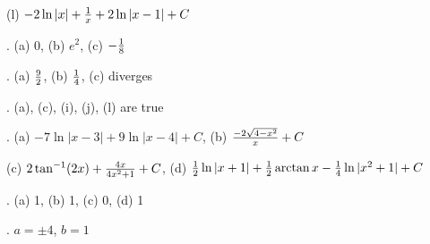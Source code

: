 \documentclass[12pt]{article}
\begin{document}
\noindent (l)  $-2 \ln|x| + {{1}\over{x}} + 2 \ln|x-1| + C$

. (a) 0, (b) $e^2$, (c) $-{{1}\over{8}}$ 

. (a) ${{9}\over{2}}$, (b) ${{1}\over{4}}$, (c) diverges

.  (a), (c), (i), (j), (l) are true

. (a) $-7 \ln|x-3|+9\ln |x-4|+C$,  (b) ${{-2\sqrt{4-x^2}}\over{x}}+ 
C$ 

\noindent (c) $2 \tan ^{-1}(2x)+{{4x}\over{4x^2+1}}+C$, (d) 
${{1}\over{2}}\ln|x+1|+{{1}\over{2}}\arctan x-{{1}\over{4}}\ln|x^2+1|+C$

. (a) 1, (b) 1, (c) 0, (d) 1

.  $a = \pm 4$, $b=1$
\end{document}
